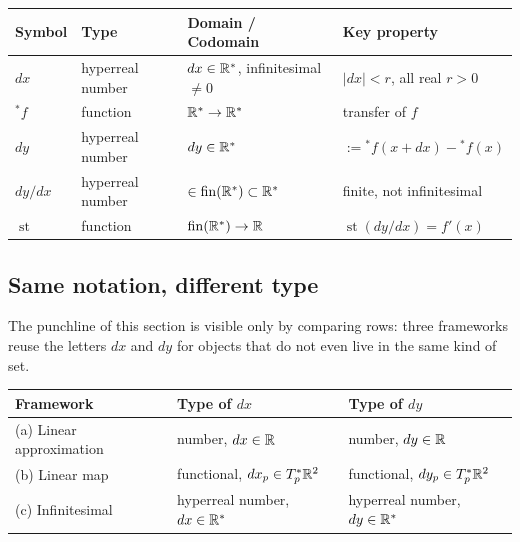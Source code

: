 \documentclass{essay}
\begin{document}
\begin{center}
  \small
  \renewcommand{\arraystretch}{1.35}
  \begin{tabular}{@{}l l l l@{}}
    \toprule
    \textbf{Symbol} & \textbf{Type} & \textbf{Domain / Codomain} & \textbf{Key property} \\
    \midrule
    \(dx\)        & hyperreal number & \(dx \in \mathbb{R}^*\), infinitesimal \(\neq 0\) & \(\lvert dx\rvert < r\), all real \(r>0\) \\
    \({}^*\!f\)   & function        & \(\mathbb{R}^* \to \mathbb{R}^*\)                       & transfer of \(f\) \\
    \(dy\)        & hyperreal number & \(dy \in \mathbb{R}^*\)                        & \(:= {}^*\!f(x+dx) - {}^*\!f(x)\) \\
    \(dy/dx\)     & hyperreal number & \(\in \mathrm{fin}(\mathbb{R}^*) \subset \mathbb{R}^*\) & finite, not infinitesimal \\
    \(\operatorname{st}\) & function & \(\mathrm{fin}(\mathbb{R}^*) \to \mathbb{R}\)          & \(\operatorname{st}(dy/dx) = f'(x)\) \\
    \bottomrule
  \end{tabular}
\end{center}

\subsection*{Same notation, different type}

The punchline of this section is visible only by comparing rows: three frameworks reuse the letters \(dx\) and \(dy\) for objects that do not even live in the same kind of set.

\begin{center}
  \renewcommand{\arraystretch}{1.35}
  \begin{tabular}{@{}l l l@{}}
    \toprule
    \textbf{Framework} & \textbf{Type of \(dx\)} & \textbf{Type of \(dy\)} \\
    \midrule
    (a) Linear approximation & number, \(dx \in \mathbb{R}\)                & number, \(dy \in \mathbb{R}\) \\
    (b) Linear map            & functional, \(dx_{p} \in T_{p}^*\mathbb{R}^{2}\)   & functional, \(dy_{p} \in T_{p}^*\mathbb{R}^{2}\) \\
    (c) Infinitesimal         & hyperreal number, \(dx \in \mathbb{R}^*\)    & hyperreal number, \(dy \in \mathbb{R}^*\) \\
    \bottomrule
  \end{tabular}
\end{center}
\end{document}
